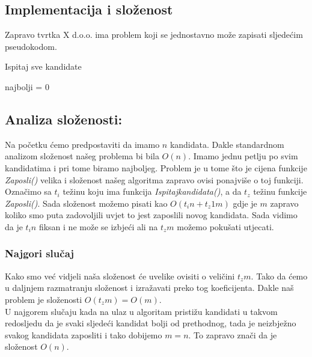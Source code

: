 \documentclass[10pt,a4paper]{article}
\begin{document}
\subsection{Implementacija i složenost} 
Zapravo tvrtka X d.o.o. ima problem koji se jednostavno može zapisati sljedećim pseudokodom.

\begin{algorithm}[H]
\caption{Ispitaj sve kandidate}
najbolji = 0\;
\end{algorithm}

\subsection*{Analiza složenosti:}
Na početku ćemo predpostaviti da imamo $n$ kandidata. Dakle standardnom analizom složenost našeg 
problema bi bila $O(n)$. Imamo jednu petlju po svim kandidatima i pri tome biramo najboljeg. 
Problem je u tome što je cijena funkcije \textit{Zaposli()} velika i složenost našeg algoritma 
zapravo ovisi ponajviše o toj funkciji.\\
Označimo sa $t_i$ težinu koju ima funkcija \textit{Ispitajkandidata()}, a da $t_z$ težinu funkcije 
\textit{Zaposli()}. Sada složenost možemo pisati kao $O(t_in + t_z1m)$ gdje je $m$ zapravo koliko 
smo puta zadovoljili uvjet to jest zaposlili novog kandidata. Sada vidimo da je $t_in$ fiksan i ne 
može se izbjeći ali na $t_zm$ možemo pokušati utjecati.
\subsubsection*{Najgori slučaj}
Kako smo već vidjeli naša složenost će uvelike ovisiti o veličini $t_zm$. 
Tako da ćemo u daljnjem razmatranju složenost i izražavati preko tog koeficijenta. Dakle naš problem 
je složenosti $O(t_zm)=O(m)$. \\
U najgorem slučaju kada na ulaz u algoritam pristižu kandidati u takvom redosljedu da je svaki sljedeći 
kandidat bolji od prethodnog, tada je neizbježno svakog kandidata zaposliti i tako dobijemo $m=n$. 
To zapravo znači da je složenost $O(n)$.
\end{document}
